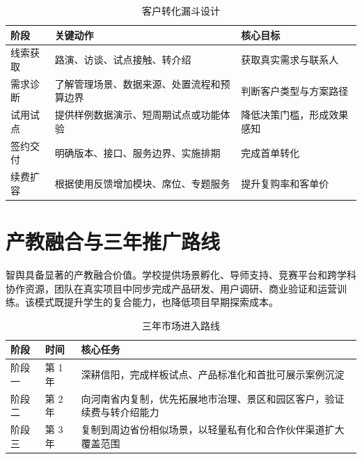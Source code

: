 \begin{table}[htbp]
	\centering
	\caption{客户转化漏斗设计}
	\begin{tabularx}{\textwidth}{L{2.8cm}Y Y}
		\toprule
		阶段   & 关键动作                  & 核心目标          \\
		\midrule
		线索获取 & 路演、访谈、试点接触、转介绍        & 获取真实需求与联系人    \\
		需求诊断 & 了解管理场景、数据来源、处置流程和预算边界 & 判断客户类型与方案路径   \\
		试用试点 & 提供样例数据演示、短周期试点或功能体验   & 降低决策门槛，形成效果感知 \\
		签约交付 & 明确版本、接口、服务边界、实施排期     & 完成首单转化        \\
		续费扩容 & 根据使用反馈增加模块、席位、专题服务    & 提升复购率和客单价     \\
		\bottomrule
	\end{tabularx}
\end{table}

\section{产教融合与三年推广路线}

智舆具备显著的产教融合价值。学校提供场景孵化、导师支持、竞赛平台和跨学科协作资源，团队在真实项目中同步完成产品研发、用户调研、商业验证和运营训练。该模式既提升学生的复合能力，也降低项目早期探索成本。

\begin{table}[htbp]
	\centering
	\caption{三年市场进入路线}
	\begin{tabularx}{\textwidth}{L{2cm}L{2cm}Y}
		\toprule
		阶段  & 时间    & 核心任务                                \\
		\midrule
		阶段一 & 第 1 年 & 深耕信阳，完成样板试点、产品标准化和首批可展示案例沉淀         \\
		阶段二 & 第 2 年 & 向河南省内复制，优先拓展地市治理、景区和园区客户，验证续费与转介绍能力 \\
		阶段三 & 第 3 年 & 复制到周边省份相似场景，以轻量私有化和合作伙伴渠道扩大覆盖范围     \\
		\bottomrule
	\end{tabularx}
\end{table}
